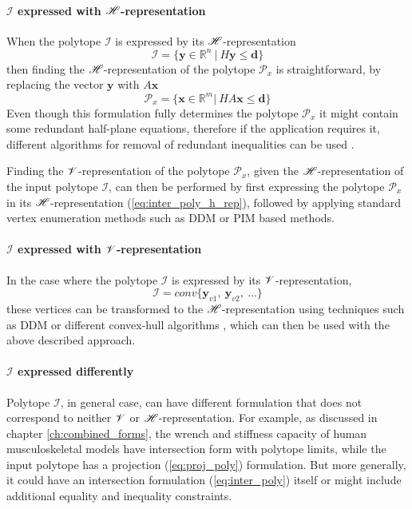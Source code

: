 \paragraph*{$\mathcal{I}$ expressed with $\mathscr{H}$-representation } When the polytope $\mathcal{I}$ is expressed by its $\mathscr{H}$-representation 
\begin{equation}
    \mathcal{I} = \{ \bm{y}\in \mathbb{R}^n ~|~H\bm{y} \leq \bm{d}\}
\end{equation}
then finding the $\mathscr{H}$-representation of the polytope $\mathcal{P}_x$ is straightforward, by replacing the vector $\bm{y}$ with $A\bm{x}$
\begin{equation}
    \mathcal{P}_x=\{\bm{x}\in  \mathbb{R}^m|~ HA\bm{x} \leq \bm{d} \}
    \label{eq:inter_poly_h_rep}
\end{equation}
Even though this formulation fully determines the polytope $\mathcal{P}_x$ it might contain some redundant half-plane equations, therefore if the application requires it, different algorithms for removal of redundant inequalities can be used \cite{Paulraj2006}.

Finding the $\mathscr{V}$-representation of the polytope $\mathcal{P}_x$, given the $\mathscr{H}$-representation  of the input polytope $\mathcal{I}$, can then be performed by first expressing the polytope $\mathcal{P}_x$ in its $\mathscr{H}$-representation (\ref{eq:inter_poly_h_rep}), followed by applying standard vertex enumeration methods such as DDM\cite{fukuda_dd} or PIM\cite{avis_pivoting_nodate} based methods. 



\paragraph*{$\mathcal{I}$ expressed with $\mathscr{V}$-representation } 
In the case where the polytope $\mathcal{I}$ is expressed by its $\mathscr{V}$-representation, 
\begin{equation}
    \mathcal{I} = conv\{ \bm{y}_{v1}, ~ \bm{y}_{v2},~ \ldots\}
\end{equation}
these vertices can be transformed to the $\mathscr{H}$-representation using techniques such as DDM \cite{fukuda_dd} or different convex-hull algorithms \cite{Barber1996}, which can then be used with the above described approach.

\paragraph*{$\mathcal{I}$ expressed differently} Polytope $\mathcal{I}$, in general case, can have different formulation that does not correspond to neither $\mathscr{V}$ or $\mathscr{H}$-representation. For example, as discussed in chapter \ref{ch:combined_forms}, the wrench and stiffness capacity of human musculoskeletal models have intersection form with polytope limits, while the input polytope has a projection (\ref{eq:proj_poly}) formulation. But more generally, it could have an intersection formulation (\ref{eq:inter_poly}) itself or might include additional equality and inequality constraints. 

